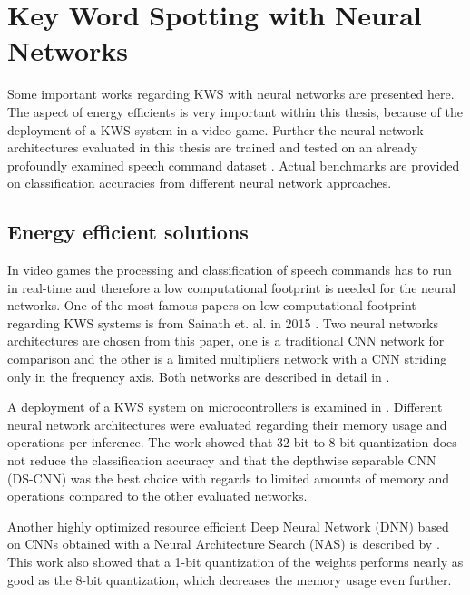 
\section{Key Word Spotting with Neural Networks}\label{sec:prev_kws}
\thesisStateNotReady
Some important works regarding KWS with neural networks are presented here. 
The aspect of energy efficients is very important within this thesis, because of the deployment of a KWS system in a video game.
Further the neural network architectures evaluated in this thesis are trained and tested on an already profoundly examined speech command dataset \cite{Warden2018}.
Actual benchmarks are provided on classification accuracies from different neural network approaches.



\subsection{Energy efficient solutions}
In video games the processing and classification of speech commands has to run in real-time and therefore a low computational footprint is needed for the neural networks.
One of the most famous papers on low computational footprint regarding KWS systems is from Sainath et. al. in 2015 \cite{Sainath2015}.
Two neural networks architectures are chosen from this paper, one is a traditional CNN network for comparison and the other is a limited multipliers network with a CNN striding only in the frequency axis.
Both networks are described in detail in .

A deployment of a KWS system on microcontrollers is examined in \cite{Zhang2017}.
Different neural network architectures were evaluated regarding their memory usage and operations per inference.
The work showed that 32-bit to 8-bit quantization does not reduce the classification accuracy and that the depthwise separable CNN (DS-CNN) was the best choice with regards to limited amounts of memory and operations compared to the other evaluated networks.

Another highly optimized resource efficient Deep Neural Network (DNN) based on CNNs obtained with a Neural Architecture Search (NAS) is described by \cite{Peter2020}.
This work also showed that a 1-bit quantization of the weights performs nearly as good as the 8-bit quantization, which decreases the memory usage even further.



